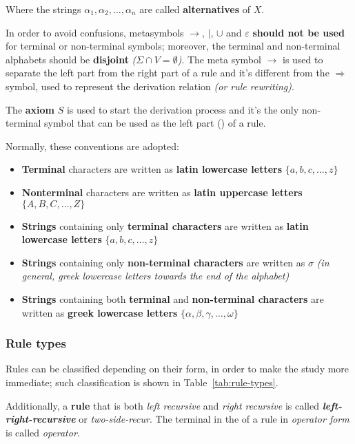 \documentclass[english]{article}
\begin{document}
Where the strings \(\alpha_1, \alpha_2, \ldots, \alpha_n\) are called \textbf{alternatives} of \(X\).

In order to avoid confusions, metasymbols \(\rightarrow\), \(|\), \(\cup\) and \(\varepsilon\) \textbf{should not be used} for terminal or non-terminal symbols;
moreover, the terminal and non-terminal alphabets should be \textbf{disjoint} \textit{(\(\Sigma \cap V = \emptyset\))}.
The meta symbol \(\rightarrow\) is used to separate the left part from the right part of a rule and it's different from the \(\Rightarrow\) symbol, used to represent the derivation relation \textit{(or rule rewriting)}.

The \textbf{axiom} \(S\) is used to start the derivation process and it's the only non-terminal symbol that can be used as the left part (\LP) of a rule.

\bigskip
Normally, these conventions are adopted:

\begin{itemize}
  \item \textbf{Terminal} characters are written as \textbf{latin lowercase letters} \(\{a, b, c, \ldots, z\}\)
  \item \textbf{Nonterminal} characters are written as \textbf{latin uppercase letters} \(\{A, B, C, \ldots, Z\}\)
  \item \textbf{Strings} containing only \textbf{terminal characters} are written as \textbf{latin lowercase letters} \(\{a, b, c, \ldots, z\}\)
  \item \textbf{Strings} containing only \textbf{non-terminal characters} are written as \(\sigma\) \textit{(in general, greek lowercase letters towards the end of the alphabet)}
  \item \textbf{Strings} containing both \textbf{terminal} and \textbf{non-terminal characters} are written as \textbf{greek lowercase letters} \(\{\alpha, \beta, \gamma, \ldots, \omega\}\)
\end{itemize}

\subsubsection{Rule types}

Rules can be classified depending on their form, in order to make the study more immediate;
such classification is shown in Table~\ref{tab:rule-types}.

Additionally, a \textbf{rule} that is both \textit{left recursive} and \textit{right recursive} is called \textbf{\textit{left-right-recursive}} or \textit{two-side-recur}.
The terminal in the \RP of a rule in \textit{operator form} is called \textit{operator}.
\end{document}
